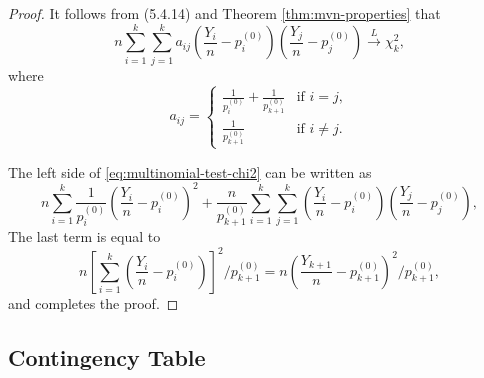 \begin{proof}
	It follows from (5.4.14) and Theorem \ref{thm:mvn-properties} that
	\begin{equation}
		\label{eq:multinomial-test-chi2}
		n\sum_{i=1}^{k}\sum_{j=1}^{k}a_{ij}\left(\frac{Y_i}{n}-p_i^{(0)}\right)\left(\frac{Y_j}{n}-p_j^{(0)}\right)\xrightarrow{L}\chi_k^2,
	\end{equation}
	where
	\begin{equation*}
		a_{ij}=\begin{cases}
			\frac{1}{p_{i}^{(0)}}+\frac{1}{p_{k+1}^{(0)}} & \text{if }i=j,     \\
			\frac{1}{p_{k+1}^{(0)}}                       & \text{if }i\neq j.
		\end{cases}
	\end{equation*}

	The left side of \eqref{eq:multinomial-test-chi2} can be written as
	\begin{equation*}
		n\sum_{i=1}^{k}\frac{1}{p_i^{(0)}}\left(\frac{Y_i}{n}-p_i^{(0)}\right)^2+\frac{n}{p_{k+1}^{(0)}}\sum_{i=1}^{k}\sum_{j=1}^k\left(\frac{Y_i}{n}-p_i^{(0)}\right)\left(\frac{Y_j}{n}-p_j^{(0)}\right),
	\end{equation*}
	The last term is equal to
	\begin{equation*}
		n\left[\sum_{i=1}^k\left(\frac{Y_i}{n}-p_i^{(0)}\right)\right]^2/p_{k+1}^{(0)}=n\left(\frac{Y_{k+1}}{n}-p_{k+1}^{(0)}\right)^2/p_{k+1}^{(0)},
	\end{equation*}
	and completes the proof.
\end{proof}

\subsection{Contingency Table}
